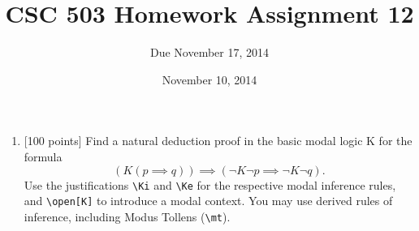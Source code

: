 \documentclass{article}
\title{CSC 503 Homework Assignment 12}
\author{Due November 17, 2014}
\date{November 10, 2014}
\begin{document}
\maketitle

\begin{enumerate}

\item {[100 points]} Find a natural deduction proof in the basic modal
  logic K for the formula
  \begin{displaymath}
    (K (p \implies q)) \implies (\neg K \neg p \implies \neg K \neg q).
  \end{displaymath}
  Use the justifications \verb+\Ki+ and \verb+\Ke+ for the respective
  modal inference rules, and \verb+\open[K]+ to introduce a modal
  context.  You may use derived rules of inference, including Modus
  Tollens (\verb+\mt+).

\end{enumerate}
\end{document}
